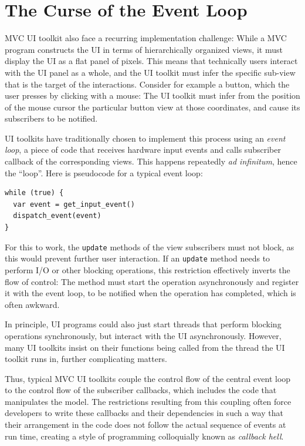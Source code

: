 \documentclass[sigplan,screen]{acmart}
\begin{document}
\section{The Curse of the Event Loop}
\label{sec:event-loop}

MVC UI toolkit also face a recurring implementation challenge: While a
MVC program constructs the UI in terms of hierarchically organized
views, it must display the UI as a flat panel of pixels.  This means
that technically users interact with the UI panel as a whole, and the
UI toolkit must infer the specific sub-view that is the target of the interactions.
Consider for example a button, which the user presses by clicking with
a mouse: The UI toolkit must infer from the position of the mouse
cursor the particular button view at those coordinates, and cause its
subscribers to be notified.

UI toolkits have traditionally chosen to implement this process using
an \textit{event loop}, a piece of code that receives hardware input
events and calls subscriber callback of the corresponding
views.  This happens repeatedly \textit{ad infinitum}, hence the
``loop''.  Here is pseudocode for a typical event loop:
%
\begin{verbatim}
while (true) {
  var event = get_input_event()
  dispatch_event(event)
}
\end{verbatim}
%
For this to work, the \texttt{update} methods of the view
subscribers must not block, as this would prevent further user
interaction.  If an \texttt{update} method needs to perform I/O or
other blocking operations, this restriction effectively inverts the
flow of control: The method must start the operation asynchronously
and register it with the event loop, to be notified when the operation
has completed, which is often awkward.

In principle, UI programs could also just start threads that perform
blocking operations synchronously, but interact with the UI
asynchronously.  However, many UI toolkits insist on their functions
being called from the thread the UI toolkit runs in, further
complicating matters.

Thus, typical MVC UI toolkits couple the control flow of the
central event loop to the control flow of the subscriber callbacks,
which includes the code that manipulates the model.  The restrictions
resulting from this coupling often force developers to write these
callbacks and their dependencies in such a way that their arrangement
in the code does not follow the actual sequence of events at run time,
creating a style of programming colloquially known as \textit{callback
  hell}.
\end{document}
